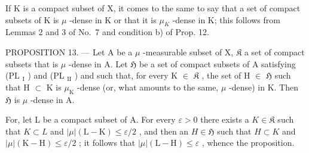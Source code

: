 If K is a compact subset of X, it comes to the same to say that a set of compact subsets of K is \(\mu\) -dense in K or that it is \(\mu_{K}\) -dense in K; this follows from Lemmas 2 and 3 of No.~7 and condition b) of Prop. 12.

PROPOSITION 13. --- Let A be a \(\mu\) -measurable subset of X, \(\mathfrak{K}\) a set of compact subsets that is \(\mu\) -dense in A. Let \(\mathfrak{H}\) be a set of compact subsets of A satisfying (PL \(_{\text{I}}\) ) and (PL \(_{\text{II}}\) ) and such that, for every K \(\in\) \(\mathfrak{K}\) , the set of H \(\in\) \(\mathfrak{H}\) such that H \(\subset\) K is \(\mu_{\text{K}}\) -dense (or, what amounts to the same, \(\mu\) -dense) in K. Then \(\mathfrak{H}\) is \(\mu\) -dense in A.

For, let L be a compact subset of A. For every \(\varepsilon > 0\) there exists a \(K \in \mathfrak{K}\) such that \(K \subset L\) and \(|\mu|(\mathrm{L} - \mathrm{K}) \leqslant \varepsilon/2\) , and then an \(H \in \mathfrak{H}\) such that \(H \subset K\) and \(|\mu|(\mathrm{K} - \mathrm{H}) \leqslant \varepsilon/2\) ; it follows that \(|\mu|(\mathrm{L} - \mathrm{H}) \leqslant \varepsilon\) , whence the proposition.

